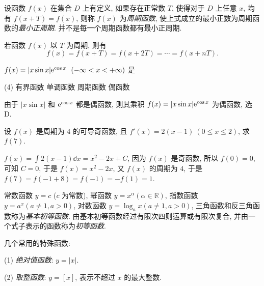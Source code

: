 \begin{definition}[周期性]
    设函数 $ f(x) $ 在集合 $ D $ 上有定义, 如果存在正常数 $ T $, 使得对于 $ D $ 上任意 $ x $, 均有 $ f(x+T)=f(x) $, 则称 $ f(x) $ 为\textit{周期函数}, 使上式成立的最小正数为周期函数的\textit{最小正周期}. 并不是每一个周期函数都有最小正周期.
\end{definition}

\begin{theorem}[函数的周期性定理]
    若函数 $f(x)$ 以 $T$ 为周期, 则有 $$f(x)=f(x+T)=f(x+2T)=\cdots=f(x+nT).$$
\end{theorem}

\begin{example}[1987 数二]
    $f(x)=|x\sin x|\mathrm{e}^{\cos x}~~(-\infty<x<+\infty)$ 是
    \begin{tasks}(4)
        \task 有界函数
        \task 单调函数
        \task 周期函数
        \task 偶函数
    \end{tasks}
\end{example}
\begin{solution}
    由于 $|x\sin x|$ 和 $\mathrm{e}^{\cos x}$ 都是偶函数, 则其乘积 $f(x)=|x\sin x|\mathrm{e}^{\cos x}$ 为偶函数, 选 D.
\end{solution}

\begin{example}[2014 数一]
    设 $f(x)$ 是周期为 4 的可导奇函数, 且 $f'(x)=2(x-1)~ (0\leqslant x\leqslant 2)$, 求 $f(7)$.
\end{example}
\begin{solution}
    $f(x)=\displaystyle\int 2(x-1)\dd x=x^2-2x+C$, 因为 $f(x)$ 是奇函数, 所以 $f(0)=0$, 可知 $C=0$, 于是 $f(x)=x^2-2x$,
    又 $f(x)$ 的周期为 $4$, 于是 $f(7)=f(-1+8)=f(-1)=-f(1)=1$.
\end{solution}

\begin{definition}[基本初等函数与初等函数]
    常数函数 $ y=c$ ($c $ 为常数), 幂函数 $ y=x^{\alpha}(\alpha \in \mathbb{R}) $, 指数函数 $ y=a^{x}(a \neq 1, a>0) $, 对数函数 $ y=\log _{a} x(a \neq 1, a>0) $, 三角函数和反三角函数称为\textit{基本初等函数}. 由基本初等函数经过有限次四则运算或有限次复合, 并由一个式子表示的函数称为\textit{初等函数}.
\end{definition}

几个常用的特殊函数:

(1) \textit{绝对值函数}: $ y=|x|$.

(2) \textit{取整函数}: $ y=[x] $, 表示不超过 $ x $ 的最大整数.

